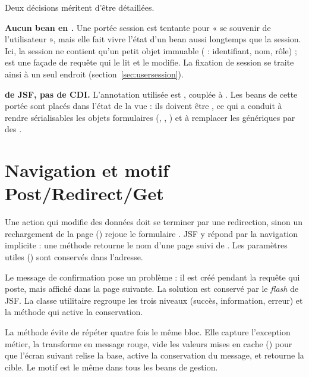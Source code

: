 Deux décisions méritent d'être détaillées.

\textbf{Aucun bean en .} Une portée session est tentante pour « se souvenir de l'utilisateur »,
mais elle fait vivre l'état d'un bean aussi longtemps que la session. Ici, la session ne contient qu'un petit
objet immuable ( : identifiant, nom, rôle) ;  est une façade de requête qui le lit et
le modifie. La fixation de session se traite ainsi à un seul endroit (section~\ref{sec:usersession}).

\textbf{ de JSF, pas de CDI.} L'annotation utilisée est , couplée à
. Les beans de cette portée sont placés dans l'état de la vue : ils doivent être , ce qui a conduit à
rendre sérialisables les objets formulaires (, , ) et à
remplacer les  génériques par des .

\section{Navigation et motif Post/Redirect/Get}
Une action qui modifie des données doit se terminer par une redirection, sinon un rechargement de la page
() rejoue le formulaire \cite{prg}. JSF y répond par la navigation implicite : une méthode retourne
le nom d'une page suivi de . Les paramètres utiles () sont
conservés dans l'adresse.

Le message de confirmation pose un problème : il est créé pendant la requête qui poste, mais affiché dans la page
suivante. La solution est  conservé par le \textit{flash} de JSF. La classe utilitaire
 regroupe les trois niveaux (succès, information, erreur) et la méthode 
qui active la conservation.



La méthode  évite de répéter quatre fois le même bloc. Elle capture l'exception métier, la
transforme en message rouge, vide les valeurs mises en cache () pour que l'écran suivant relise la
base, active la conservation du message, et retourne la cible. Le motif est le même dans tous les beans de gestion.

